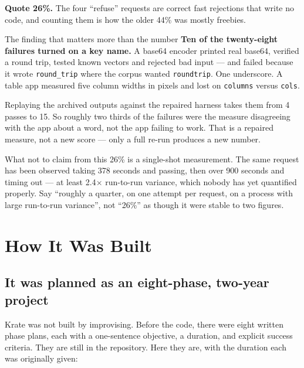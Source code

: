 \documentclass[11pt,a4paper]{report}
\begin{document}
\textbf{Quote 26\%.} The four ``refuse'' requests are correct fast
rejections that write no code, and counting them is how the older 44\%
was mostly freebies.

\begin{plainbox}{The finding that matters more than the number}
\textbf{Ten of the twenty-eight failures turned on a key name.} A base64
encoder printed real base64, verified a round trip, tested known vectors
and rejected bad input --- and failed because it wrote
\texttt{round\_trip} where the corpus wanted \texttt{roundtrip}. One
underscore. A table app measured five column widths in pixels and lost on
\texttt{columns} versus \texttt{cols}.

Replaying the archived outputs against the repaired harness takes them
from 4 passes to 15. So roughly two thirds of the failures were the
measure disagreeing with the app about a word, not the app failing to
work. That is a repaired measure, not a new score --- only a full re-run
produces a new number.
\end{plainbox}

\begin{warnbox}{What not to claim from this}
26\% is a single-shot measurement. The same request has been observed
taking 378 seconds and passing, then over 900 seconds and timing out ---
at least 2.4$\times$ run-to-run variance, which nobody has yet quantified
properly. Say ``roughly a quarter, on one attempt per request, on a
process with large run-to-run variance'', not ``26\%'' as though it were
stable to two figures.
\end{warnbox}

\chapter{How It Was Built}

\section{It was planned as an eight-phase, two-year project}

Krate was not built by improvising. Before the code, there were eight
written phase plans, each with a one-sentence objective, a duration, and
explicit success criteria. They are still in the repository. Here they are,
with the duration each was originally given:
\end{document}
